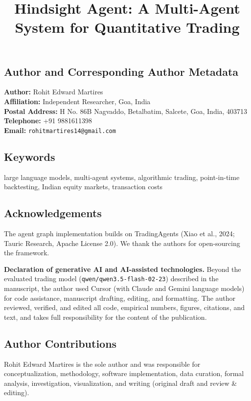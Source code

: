 \documentclass{article}
\title{Hindsight Agent: A Multi-Agent System for Quantitative Trading}
\author{}
\date{}
\begin{document}
\maketitle
\vspace{-2em}

\subsection*{Author and Corresponding Author Metadata}

\textbf{Author:} Rohit Edward Martires\\
\textbf{Affiliation:} Independent Researcher, Goa, India\\
\textbf{Postal Address:} H No. 86B Nagvaddo, Betalbatim, Salcete, Goa, India, 403713
\textbf{Telephone:} +91 9881611398 \\
\textbf{Email:} \texttt{rohitmartires14@gmail.com}

\subsection*{Keywords}

large language models, multi-agent systems, algorithmic trading, point-in-time backtesting, Indian equity markets, transaction costs

\subsection*{Acknowledgements}

The agent graph implementation builds on TradingAgents (Xiao et al., 2024; Tauric Research, Apache License 2.0). We thank the authors for open-sourcing the framework.

\textbf{Declaration of generative AI and AI-assisted technologies.} Beyond the evaluated trading model (\texttt{qwen/qwen3.5-flash-02-23}) described in the manuscript, the author used Cursor (with Claude and Gemini language models) for code assistance, manuscript drafting, editing, and formatting. The author reviewed, verified, and edited all code, empirical numbers, figures, citations, and text, and takes full responsibility for the content of the publication.

\subsection*{Author Contributions}

Rohit Edward Martires is the sole author and was responsible for conceptualization, methodology, software implementation, data curation, formal analysis, investigation, visualization, and writing (original draft and review \& editing).
\end{document}
